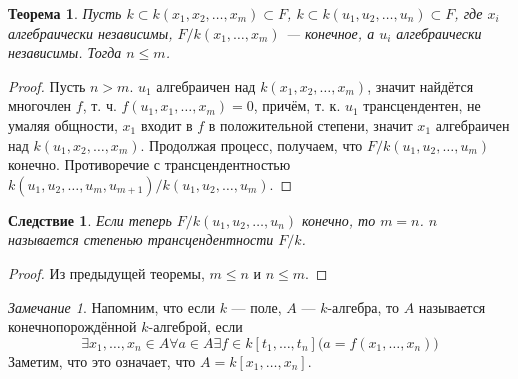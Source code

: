 \documentclass{article}
\newtheorem*{theorem}{Теорема}
\newtheorem*{corollary}{Следствие}
\theoremstyle{definition}
\theoremstyle{remark}
\newtheorem*{remark}{Замечание}
\begin{document}
\begin{theorem}
	Пусть $k \subset k(x_1, x_2, \ldots, x_m)  \subset F$, $k \subset k(u_1, u_2, \ldots, u_n) \subset F$, где $x_i$ алгебраически независимы, $F/k(x_1, \ldots, x_m)$ --- конечное, а $u_i$ алгебраически независимы. Тогда $n \leq m$.
\end{theorem}
\begin{proof}
	Пусть $n > m$. $u_1$ алгебраичен над $k(x_1, x_2, \ldots, x_m)$, значит найдётся многочлен $f$, т. ч. $f(u_1, x_1, \ldots, x_m) = 0$, причём, т. к. $u_1$ трансцендентен, не умаляя общности, $x_1$ входит в $f$ в положительной степени, значит $x_1$ алгебраичен над $k(u_1, x_2, \ldots, x_m)$. Продолжая процесс, получаем, что $F / k(u_1, u_2, \ldots, u_m)$ конечно. Противоречие с трансцендентностью $k(u_1, u_2, \ldots, u_m, u_{m + 1}) / k(u_1, u_2, \ldots, u_m)$.
\end{proof}


\begin{corollary}
	Если теперь $F / k(u_1, u_2, \ldots, u_n)$ конечно, то $m = n$. $n$ называется степенью трансцендентности $F/k$.
\end{corollary}
\begin{proof}
	Из предыдущей теоремы, $m \leq n$ и $n \leq m$.
\end{proof}

\begin{remark}
    Напомним, что если $k$ --- поле, $A$ --- $k$-алгебра, то $A$ называется конечнопорождённой $k$-алгеброй, если
    \begin{equation*}
        \exists x_1, \hdots, x_n \in A \forall a \in A \exists f \in k[t_1, \hdots, t_n] \big( a = f(x_1, \hdots, x_n) \big)
    \end{equation*}
    Заметим, что это означает, что $A = k[x_1,\hdots, x_n]$.
\end{remark}
\end{document}
